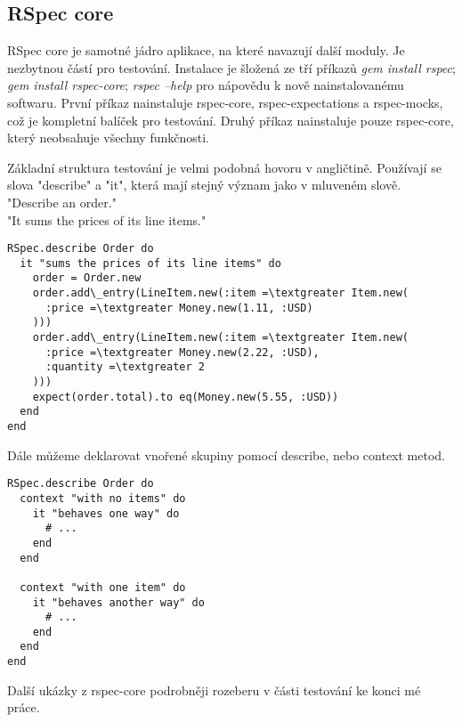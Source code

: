 \subsection{RSpec core}
\par RSpec core je samotné jádro aplikace, na které navazují další moduly. Je nezbytnou částí pro testování. Instalace je šložená ze tří příkazů \textit{gem install rspec}; \textit{gem install rspec-core}; \textit{rspec --help} pro nápovědu k nově nainstalovanému softwaru. První příkaz nainstaluje rspec-core, rspec-expectations a rspec-mocks, což je kompletní balíček pro testování. Druhý příkaz nainstaluje pouze rspec-core, který neobsahuje všechny funkčnosti.
\par Základní struktura testování je velmi podobná hovoru v angličtině. Používají se slova "describe" a "it", která mají stejný význam jako v mluveném slově.\\
"Describe an order."\\
"It sums the prices of its line items."\\
\begin{verbatim}
RSpec.describe Order do
  it "sums the prices of its line items" do
    order = Order.new
    order.add\_entry(LineItem.new(:item =\textgreater Item.new(
      :price =\textgreater Money.new(1.11, :USD)
    )))
    order.add\_entry(LineItem.new(:item =\textgreater Item.new(
      :price =\textgreater Money.new(2.22, :USD),
      :quantity =\textgreater 2
    )))
    expect(order.total).to eq(Money.new(5.55, :USD))
  end
end
\end{verbatim}
Dále můžeme deklarovat vnořené skupiny pomocí describe, nebo context metod.
\begin{verbatim}
RSpec.describe Order do
  context "with no items" do
    it "behaves one way" do
      # ...
    end
  end

  context "with one item" do
    it "behaves another way" do
      # ...
    end
  end
end
\end{verbatim}
Další ukázky z rspec-core podrobněji rozeberu v části testování ke konci mé práce.

